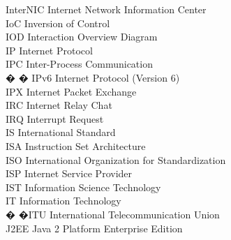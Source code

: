 \begin{tabbing}
    \>InterNIC \>\>Internet Network Information Center\\

    \>IoC \>\>Inversion of Control\\

    \>IOD \>\>Interaction Overview Diagram\\


    \>IP \>\>Internet Protocol\\

    \>IPC \>\>Inter-Process Communication\\

� � \>IPv6 \>\>Internet Protocol (Version 6)\\

    \>IPX \>\>Internet Packet Exchange\\

    \>IRC \>\>Internet Relay Chat\\

    \>IRQ \>\>Interrupt Request\\

    \>IS \>\>International Standard\\

    \>ISA \>\>Instruction Set Architecture\\



    \>ISO \>\>International Organization for Standardization\\

    \>ISP \>\>Internet Service Provider\\

    \>IST \>\>Information Science Technology\\

    \>IT \>\>Information Technology\\


 � �\>ITU \>\>International Telecommunication Union\\

    \>J2EE \>\>Java 2 Platform Enterprise Edition\\


\end{tabbing}
